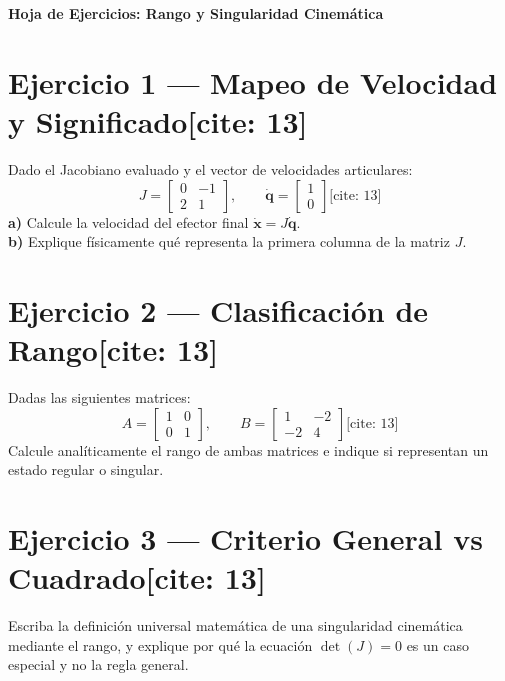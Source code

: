 \documentclass[11pt, a4paper]{article}
\begin{document}
\begin{center}
    \Large\textbf{\textcolor{ucbblue}{Hoja de Ejercicios: Rango y Singularidad Cinemática}}\\[0.2cm]
\end{center}

\vspace{0.4cm}

\section*{Ejercicio 1 — Mapeo de Velocidad y Significado[cite: 13]}
Dado el Jacobiano evaluado y el vector de velocidades articulares:
\begin{equation*}
    J = \begin{bmatrix} 0 & -1 \\ 2 & 1 \end{bmatrix}, \qquad \dot{\mathbf{q}} = \begin{bmatrix} 1 \\ 0 \end{bmatrix} \text{[cite: 13]}
\end{equation*}
\textbf{a)} Calcule la velocidad del efector final $\dot{\mathbf{x}} = J\dot{\mathbf{q}}$. \\
\textbf{b)} Explique físicamente qué representa la primera columna de la matriz $J$.
\vspace{2.5cm}

\section*{Ejercicio 2 — Clasificación de Rango[cite: 13]}
Dadas las siguientes matrices:
\begin{equation*}
    A = \begin{bmatrix} 1 & 0 \\ 0 & 1 \end{bmatrix}, \qquad B = \begin{bmatrix} 1 & -2 \\ -2 & 4 \end{bmatrix} \text{[cite: 13]}
\end{equation*}
Calcule analíticamente el rango de ambas matrices e indique si representan un estado regular o singular.
\vspace{3cm}

\section*{Ejercicio 3 — Criterio General vs Cuadrado[cite: 13]}
Escriba la definición universal matemática de una singularidad cinemática mediante el rango, y explique por qué la ecuación $\det(J) = 0$ es un caso especial y no la regla general.
\vspace{3cm}
\end{document}
